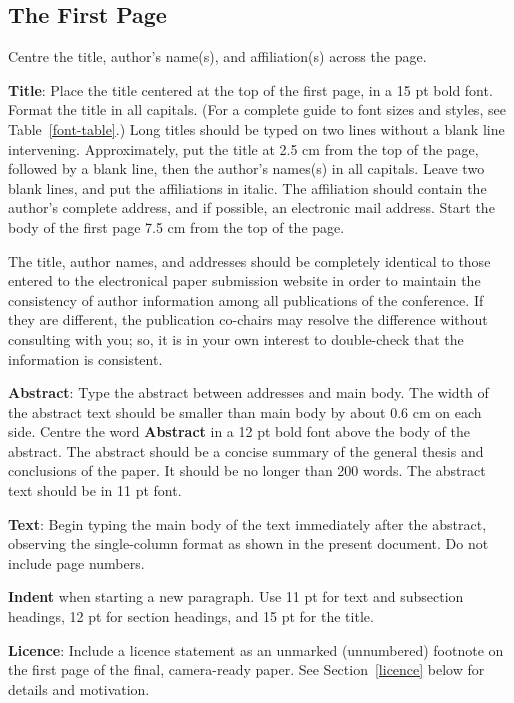 \documentclass[11pt]{article}
\begin{document}
\subsection{The First Page}
\label{ssec:first}

Centre the title, author's name(s), and affiliation(s) across
the page.

{\bf Title}: Place the title centered at the top of the first page, in
a 15 pt bold font. Format the title in all capitals. (For a complete guide to font sizes and styles,
see Table~\ref{font-table}.) Long titles should be typed on two lines
without a blank line intervening. Approximately, put the title at 2.5
cm from the top of the page, followed by a blank line, then the
author's names(s) in all capitals. Leave two blank lines, and put the affiliations in italic.
The affiliation should contain the author's complete address, and if possible, an electronic mail
address. Start the body of the first page 7.5 cm from the top of the
page.

The title, author names, and addresses should be completely identical
to those entered to the electronical paper submission website in order
to maintain the consistency of author information among all
publications of the conference. If they are different, the publication
co-chairs may resolve the difference without consulting with you; so, it
is in your own interest to double-check that the information is
consistent.

{\bf Abstract}: Type the abstract between addresses and main body.
The width of the abstract text should be
smaller than main body by about 0.6 cm on each side.
Centre the word {\bf Abstract} in a 12 pt bold
font above the body of the abstract. The abstract should be a concise
summary of the general thesis and conclusions of the paper. It should
be no longer than 200 words. The abstract text should be in 11 pt font.

{\bf Text}: Begin typing the main body of the text immediately after
the abstract, observing the single-column format as shown in
the present document. Do not include page numbers.

{\bf Indent} when starting a new paragraph. Use 11 pt for text and
subsection headings, 12 pt for section headings, and 15 pt for
the title.

{\bf Licence}: Include a licence statement as an unmarked (unnumbered)
footnote on the first page of the final, camera-ready paper.
See Section~\ref{licence} below for details and motivation.
\end{document}
